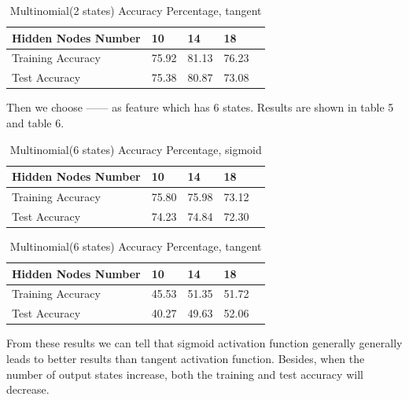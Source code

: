 \documentclass[11pt,letterpaper]{article}
\begin{document}
\begin{table}
\begin{center}
\begin{tabular}{|l|l|l|l|l|}
\hline \bf Hidden Nodes Number & \bf 10 & \bf 14 & \bf 18 \\ \hline
Training Accuracy& 75.92 & 81.13 & 76.23 \\
Test Accuracy & 75.38 & 80.87 & 73.08 \\
\hline
\end{tabular}
\end{center}
\caption{\label{multi2-tanh} Multinomial(2 states) Accuracy Percentage, tangent}
\end{table}

Then we choose ------ as feature which has 6 states. Results are shown in table 5 and table 6. 

\begin{table}
\begin{center}
\begin{tabular}{|l|l|l|l|l|}
\hline \bf Hidden Nodes Number & \bf 10 & \bf 14 & \bf 18 \\ \hline
Training Accuracy& 75.80 & 75.98 & 73.12 \\
Test Accuracy & 74.23 & 74.84 & 72.30 \\
\hline
\end{tabular}
\end{center}
\caption{\label{multi6-sig} Multinomial(6 states) Accuracy Percentage, sigmoid}
\end{table}

\begin{table}
\begin{center}
\begin{tabular}{|l|l|l|l|l|}
\hline \bf Hidden Nodes Number & \bf 10 & \bf 14 & \bf 18 \\ \hline
Training Accuracy& 45.53 & 51.35 & 51.72 \\
Test Accuracy & 40.27 & 49.63 & 52.06 \\
\hline
\end{tabular}
\end{center}
\caption{\label{multi6-tanh} Multinomial(6 states) Accuracy Percentage, tangent}
\end{table}


From these results we can tell that sigmoid activation function generally generally leads to better results than tangent activation function. 
Besides, when the number of output states increase, both the training and test accuracy will decrease.
\end{document}
